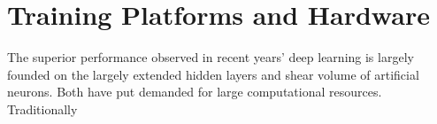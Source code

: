 \section{Training Platforms and Hardware}
The superior performance observed in recent years' deep learning is largely founded on the largely extended hidden layers and shear volume of artificial neurons. Both have put demanded for large computational resources. Traditionally 